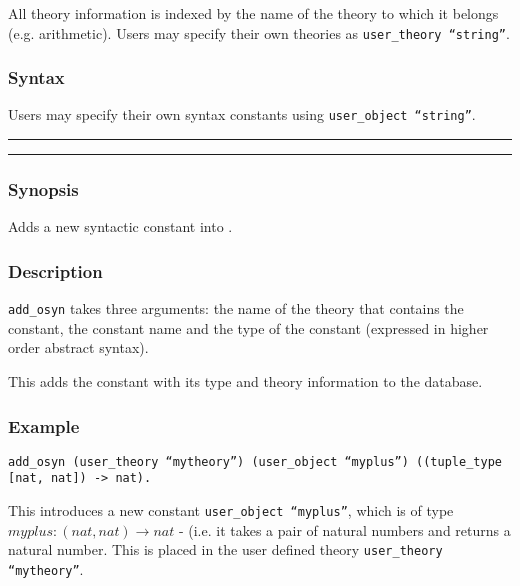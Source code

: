 All theory information is indexed by the name of the theory to which
it belongs (e.g. arithmetic).  Users may specify
their own theories as {\tt user\_theory
  ``string''}. 


\subsubsection{Syntax}

Users may specify their own syntax constants using {\tt user\_object
  ``string''}. 

\vspace{2mm}
\hrule 
\vspace{2mm}
\begin{Large}
\end{Large}
\vspace{2mm}
\hrule
\vspace{2mm}


\subsubsection*{Synopsis}
Adds a new syntactic constant into \lclam.

\subsubsection*{Description}
{\tt add\_osyn} takes three arguments: the name of
the theory that contains the constant, the constant name and the type
of the constant (expressed in higher order abstract
syntax).

This adds the constant with its type and theory information to the
database.

\subsubsection*{Example}
{\tt add\_osyn (user\_theory ``mytheory'') (user\_object ``myplus'')
  ((tuple\_type [nat, nat]) -> nat).} 

This introduces a new constant {\tt user\_object
  ``myplus''}, which is of type $myplus:(nat, nat) 
\rightarrow nat$ - (i.e. it takes a pair of natural numbers and
returns a natural number.  This is placed in the user defined theory
{\tt user\_theory ``mytheory''}.

